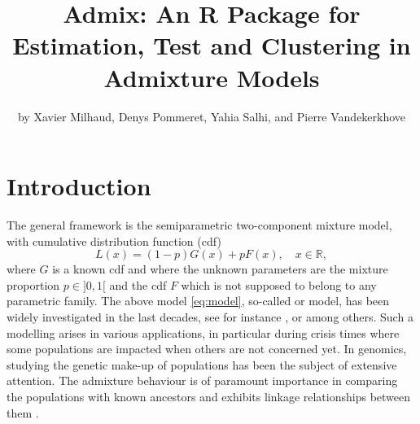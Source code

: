 \title{Admix: An R Package for Estimation, Test and Clustering in Admixture Models}


\author{by Xavier Milhaud, Denys Pommeret, Yahia Salhi, and Pierre Vandekerkhove}

\maketitle


\section{Introduction}\label{introduction}

The general framework is the semiparametric two-component mixture model, with cumulative distribution function (cdf)
\begin{equation}
 L(x) = (1-p)G(x)+pF(x), \quad x \in \mathbb{R},
 \label{eq:model}
\end{equation}
where \(G\) is a known cdf and where the unknown parameters are the mixture proportion \(p\in ]0,1[\) and the cdf \(F\) which is not supposed to belong to any parametric family. The above model \eqref{eq:model}, so-called  or  model, has been widely investigated in the last decades, see for instance \citet{Bordes+Vandekerkhove:2010}, \citet{Cai+Jin:2010} or \citet{Celisse+Robin:2010} among others. Such a modelling arises in various applications, in particular during crisis times where some populations are impacted when others are not concerned yet. In genomics, studying the genetic make-up of populations has been the subject of extensive attention. The admixture behaviour is of paramount importance in comparing the populations with known ancestors and exhibits linkage relationships between them \citep{Loh+Lipson+Patterson+Moorjani+Pickrell+Reich+Berger:2013}.

